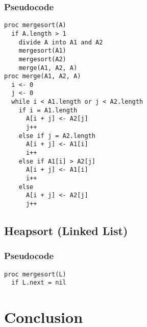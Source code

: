 \documentclass[a4paper,12pt]{article}
\begin{document}
\subsubsection{Pseudocode}
\begin{verbatim}
proc mergesort(A)
  if A.length > 1
    divide A into A1 and A2
    mergesort(A1)
    mergesort(A2)
    merge(A1, A2, A)
proc merge(A1, A2, A)
  i <- 0
  j <- 0
  while i < A1.length or j < A2.length
    if i = A1.length
      A[i + j] <- A2[j]
      j++
    else if j = A2.length
      A[i + j] <- A1[i]
      i++
    else if A1[i] > A2[j]
      A[i + j] <- A1[i]
      i++
    else 
      A[i + j] <- A2[j]
      j++     
\end{verbatim}
\subsection{Heapsort (Linked List)}
\subsubsection{Pseudocode}
\begin{verbatim}
proc mergesort(L)
  if L.next = nil
\end{verbatim}
\section{Conclusion}
\end{document}
